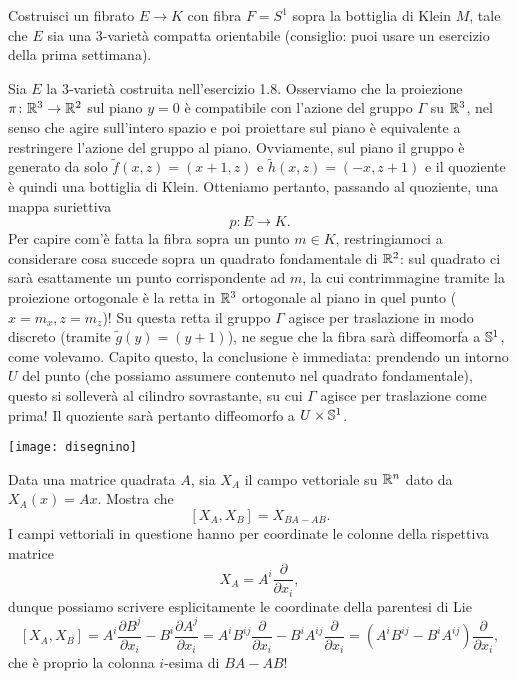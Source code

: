 \documentclass[a4paper]{article}
\begin{document}
\begin{ex}[3.9]{Costruisci un fibrato $ E \to K $ con fibra $ F = S^1 $
		sopra la bottiglia
		di Klein $ M $, tale che $ E $ sia una 3-varietà compatta orientabile (consiglio: puoi
		usare un esercizio della prima settimana).}
	
	Sia $ E $ la 3-varietà costruita nell'esercizio 1.8. Osserviamo che la proiezione $ \pi\colon \R^3 \to \R^2 $ sul piano $ y=0 $ è compatibile con l'azione del gruppo $ \Gamma $ su $ \R^3 $, nel senso che agire sull'intero spazio e poi proiettare sul piano è equivalente a restringere l'azione del gruppo al piano. Ovviamente, sul piano il gruppo è generato da solo $ \tilde{f}(x, z) = (x+1, z) $ e $ \tilde{h}(x, z) = (-x, z+1) $ e il quoziente è quindi una bottiglia di Klein. Otteniamo pertanto, passando al quoziente, una mappa suriettiva
	\[ p\colon E \to K. \]
	Per capire com'è fatta la fibra sopra un punto $ m \in K $, restringiamoci a considerare cosa succede sopra un quadrato fondamentale di $ \R^2 $: sul quadrato ci sarà esattamente un punto corrispondente ad $ m $, la cui contrimmagine tramite la proiezione ortogonale è la retta in $ \R^3 $ ortogonale al piano in quel punto ($ x = m_x, z = m_z $)! Su questa retta il gruppo $ \Gamma $ agisce per traslazione in modo discreto (tramite $ \tilde{g}(y) = (y+1) $), ne segue che la fibra sarà diffeomorfa a $ \S^1 $, come volevamo. Capito questo, la conclusione è immediata: prendendo un intorno $ U $ del punto (che possiamo assumere contenuto nel quadrato fondamentale), questo si solleverà al cilindro sovrastante, su cui $ \Gamma $ agisce per traslazione come prima! Il quoziente sarà pertanto diffeomorfo a $ U \times \S^1 $.
	
	\begin{center}
		\texttt{[image: disegnino]}
	\end{center}
\end{ex}

\begin{ex}[4.2]{Data una matrice quadrata $ A $, sia $ X_A $ il campo vettoriale su $ \R^n $ dato da $ X_A(x) = Ax $. Mostra che
		\[[X_A, X_B] = X_{BA-AB}.\]}
	I campi vettoriali in questione hanno per coordinate le colonne della rispettiva matrice
	\[ X_A = A^i \frac{\partial }{\partial x_i}, \]
	dunque possiamo scrivere esplicitamente le coordinate della parentesi di Lie
	\[ [X_A, X_B]
	= A^i \frac{\partial B^j }{\partial x_i} - B^i \frac{\partial A^j }{\partial x_i}
	= A^i B^{ij} \frac{\partial }{\partial x_i} - B^i A^{ij} \frac{\partial }{\partial x_i}
	= {\left(A^iB^{ij}-B^iA^{ij}\right)} \frac{\partial }{\partial x_i},  \]
	che è proprio la colonna $ i $-esima di $ BA-AB $!
\end{ex}
\end{document}

